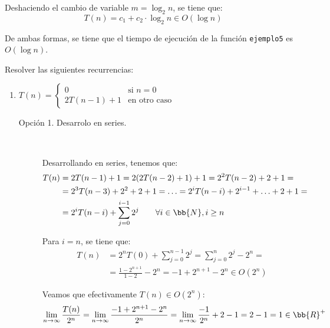 \begin{ejercicio}
\begin{enumerate}
\begin{description}
            Deshaciendo el cambio de variable $m=\log_2 n$, se tiene que:
            \begin{equation*}
                T(n) = c_1 + c_2\cdot \log_2 n \in O(\log n)
            \end{equation*}
        \end{description}

        De ambas formas, se tiene que el tiempo de ejecución de la función \verb|ejemplo5| es $O(\log n)$.
    \end{enumerate}
\end{ejercicio}


\begin{ejercicio}
    Resolver las siguientes recurrencias:
    \begin{enumerate}[label=\alph*)]
        \item $T(n) = \begin{cases}
            0 & \text{si } n = 0 \\
            2T(n-1) + 1 & \text{en otro caso}
        \end{cases}$

        \begin{description}
            \item[Opción 1. Desarrolo en series.]~
            
            Desarrollando en series, tenemos que:
            \begin{align*}
                T(n) &= 2T(n-1) + 1 = 2(2T(n-2) + 1) + 1 = 2^2T(n-2) + 2 + 1 =\\
                &= 2^3T(n-3) + 2^2 + 2 + 1 = \ldots = 2^iT(n-i) + 2^{i-1}+\ldots+2+1 =\\
                &= 2^iT(n-i)+\sum_{j=0}^{i-1} 2^j \qquad \forall i\in \bb{N}, i\geq n
            \end{align*}

            Para $i=n$, se tiene que:
            \begin{align*}
                T(n) &= 2^nT(0)+\sum_{j=0}^{n-1} 2^j
                = \sum_{j=0}^{n} 2^j - 2^n
                =\\&= \frac{1-2^{n+1}}{1-2} - 2^n = -1 + 2^{n+1} - 2^n \in O(2^n)
            \end{align*}

            Veamos que efectivamente $T(n)\in O(2^n)$:
            \begin{equation*}
                \lim_{n\to \infty} \frac{T(n)}{2^n}
                = \lim_{n\to \infty} \frac{-1 + 2^{n+1} - 2^n}{2^n}
                = \lim_{n\to \infty} \frac{-1}{2^n} + 2 - 1 = 2 - 1 = 1 \in \bb{R}^+
            \end{equation*}


\end{description}
\end{enumerate}
\end{ejercicio}
